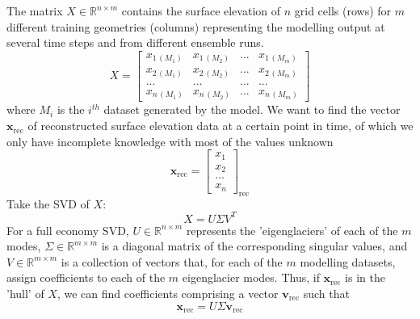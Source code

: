 \documentclass[a4paper]{article}
\begin{document}
The matrix $X \in \mathbb{R}^{n\times m}$ contains the surface elevation of $n$ grid cells (rows) for $m$ different training geometries (columns) representing the modelling output at several time steps and from different ensemble runs.
\begin{equation}
    X =
    \begin{bmatrix}
        x_{1\,(M_1)} & x_{1\,(M_2)} & ... & x_{1\,(M_m)}\\
        x_{2\,(M_1)} & x_{2\,(M_2)} & ... & x_{2\,(M_m)}\\
        ...          & ...          & ... & ...     \\
        x_{n\,(M_1)} & x_{n\,(M_2)} & ... & x_{n\,(M_m)}
    \end{bmatrix}
\end{equation}
where $M_i$ is the $i^{th}$ dataset generated by the model.
We want to find the vector $\mathbf{x}_\mathrm{rec}$ of reconstructed surface elevation data at a certain point in time, of which we only have incomplete knowledge with most of the values unknown
\begin{equation}
    \mathbf{x}_\mathrm{rec} =
    \begin{bmatrix}
        x_1\\
        x_2\\
        ...\\
        x_n       
    \end{bmatrix}_{\mathrm{rec}}
\end{equation}
Take the SVD of $X$:
\begin{equation}
    X = U \Sigma V^T
\end{equation}
For a full economy SVD, $U \in \mathbb{R}^{n\times m}$ represents the 'eigenglaciers' of each of the $m$ modes, $\Sigma \in \mathbb{R}^{m\times m}$ is a diagonal matrix of the corresponding singular values, and $V \in \mathbb{R}^{m\times m}$ is a collection of vectors that, for each of the $m$ modelling datasets, assign coefficients to each of the $m$ eigenglacier modes. Thus, if $\mathbf{x}_\mathrm{rec}$ is in the 'hull' of $X$, we can find coefficients comprising a vector $\mathbf{v}_\mathrm{rec}$ such that
\begin{equation}
    \mathbf{x}_\mathrm{rec} = U \Sigma \mathbf{v}_\mathrm{rec}
\end{equation}
\end{document}
